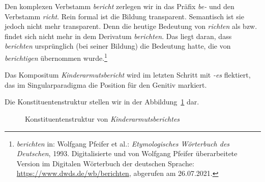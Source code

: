 Den komplexen Verbstamm \textit{bericht} zerlegen wir in das Präfix \textit{be-} und den Verbstamm \textit{richt}. Rein formal ist die Bildung transparent. Semantisch ist sie jedoch nicht mehr transparent. Denn die heutige Bedeutung von \textit{richten} als  bzw.  findet sich nicht mehr in dem Derivatum \textit{berichten}. Das liegt daran, dass \textit{berichten} ursprünglich (bei seiner Bildung) die Bedeutung  hatte, die von \textit{berichtigen} übernommen wurde.\footnote{\textit{berichten} in: Wolfgang Pfeifer et al.: \textit{Etymologisches Wörterbuch des Deutschen}, 1993. Digitalisierte und von Wolfgang Pfeifer überarbeitete Version im Digitalen Wörterbuch der deutschen Sprache: \url{https://www.dwds.de/wb/berichten}, abgerufen am 26.07.2021.}

Das Kompositum \textit{Kinderarmutsbericht} wird im letzten Schritt mit \textit{-es} flektiert, das im Singularparadigma die Position für den Genitiv markiert.  

Die Konstituentenstruktur stellen wir in der Abbildung~\ref{caption:Kinderarmutsberichtes} dar.

\begin{figure}
	\centering
	\caption{Konstituentenstruktur von \textit{Kinderarmutsberichtes} }\label{caption:Kinderarmutsberichtes}
\end{figure}



